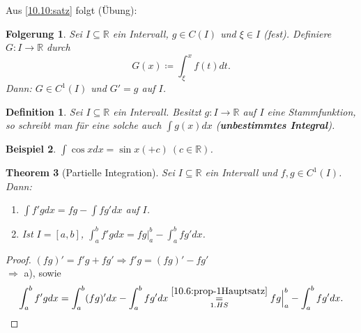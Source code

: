 \documentclass[12pt]{extreport} %
\newcommand{\R}{\mathbb{R}}
\theoremstyle{named}
\newtheorem{unnamedtheorem}{Theorem} \counterwithin{unnamedtheorem}{chapter}
\theoremstyle{dotless}
\newtheorem{beispiel}[unnamedtheorem]{Beispiel}
\newtheorem{folgerung}[unnamedtheorem]{Folgerung}
\newtheorem*{definition}{Definition}
\begin{document}
Aus \ref{10.10:satz} folgt (Übung):

\begin{folgerung} \label{10.12:folg}
	Sei $I \subseteq \R$ ein Intervall, $g \in C(I)$ und $\xi \in I$ (fest). Definiere $G \colon I \rightarrow \R$ durch
	$$ G(x) \coloneqq \int_{\xi}^{x} f(t) dt. $$
	Dann: $G \in C^{1}(I)$ und $G' = g$ auf $I$.
\end{folgerung}

\begin{definition}
	Sei $I \subseteq \R$ ein Intervall. Besitzt $g \colon I \rightarrow \R$ auf $I$ eine Stammfunktion, so schreibt man für eine solche auch $\int g(x) dx$ (\textbf{unbestimmtes Integral}).
\end{definition}

\begin{beispiel} 
	$\int \cos x dx = \sin x ( + c) ~(c \in \R)$.
\end{beispiel}

\begin{unnamedtheorem}[Partielle Integration]
	Sei $I \subseteq \R$ ein Intervall und $f, g \in C^{1}(I)$. Dann:
	\begin{enumerate}
		\item $\int f' g dx = f g - \int f g' dx$ auf $I$.
		\item Ist $I = [a, b]$, $\int_{a}^{b} f' g dx = f g \Big|_{a}^{b} - \int_{a}^{b} f g' dx$.
	\end{enumerate}
\end{unnamedtheorem}

\begin{proof}
	$(f g)' = f' g + f g' \Rightarrow f' g = (fg)' - fg'$ \\
	$\Rightarrow$ a), sowie
		$$ \int_{a}^{b} f' g dx = \int_{a}^{b} (fg)' dx - \int_{a}^{b} fg' dx \overset{\ref{10.6:prop-1Hauptsatz}}{\underset{1. HS}{=}} fg \Big|_{a}^{b} - \int_{a}^{b} fg' dx. $$ 
\end{proof}
\end{document}
